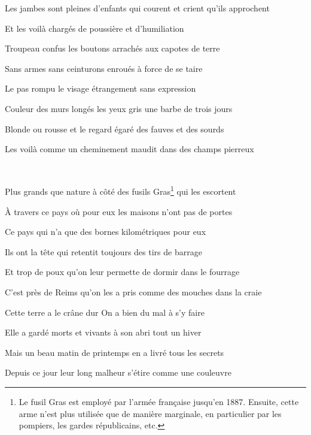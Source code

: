 {Les jambes sont pleines d'enfants qui courent et crient qu'ils approchent

\bigskip

Et les voilà chargés de poussière et d'humiliation

\bigskip

Troupeau confus les boutons arrachés aux capotes de terre

Sans armes sans ceinturons enroués à force de se taire

\bigskip

Le pas rompu le visage étrangement sans expression

\bigskip

Couleur des murs longés les yeux gris une barbe de trois jours

Blonde ou rousse et le regard égaré des fauves et des sourds

\bigskip

Les voilà comme un cheminement maudit dans des champs pierreux

\vfill{~}\pagebreak

Plus grands que nature à côté des fusils Gras\footnote{Le fusil Gras est employé par l'armée française jusqu'en 1887. Ensuite, cette arme n'est plus utilisée que de manière marginale, en particulier par les pompiers, les gardes républicains, etc.} qui les escortent

À travers ce pays où pour eux les maisons n'ont pas de portes

\bigskip

Ce pays qui n'a que des bornes kilométriques pour eux

\bigskip

Ils ont la tête qui retentit toujours des tirs de barrage

Et trop de poux qu'on leur permette de dormir dans le fourrage

\bigskip

C'est près de Reims qu'on les a pris comme des mouches dans la craie

\bigskip

Cette terre a le crâne dur On a bien du mal à s'y faire

Elle a gardé morts et vivants à son abri tout un hiver

\bigskip

Mais un beau matin de printemps en a livré tous les secrets

\bigskip

Depuis ce jour leur long malheur s'étire comme une couleuvre

}
